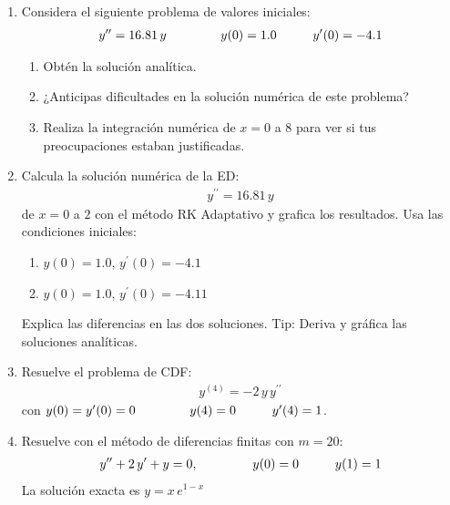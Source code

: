 \documentclass[hidelinks,12pt]{article}
\newcommand{\pderivada}[1]{\ensuremath{{#1}^{\prime}}}
\newcommand{\sderivada}[1]{\ensuremath{{#1}^{\prime \prime}}}
\newcommand{\nderivada}[2]{\ensuremath{{#1}^{(#2)}}}
\begin{document}
\begin{enumerate}
\item Considera el siguiente problema de valores iniciales:
\begin{align*}
\sderivada{y} = 16.81 \, y \hspace{1.5cm} y (0) = 1.0 \hspace{1cm} \pderivada{y} (0) = -4.1
\end{align*}
\begin{enumerate}
\item Obtén la solución analítica.
\item ¿Anticipas dificultades en la solución numérica de este problema?
\item Realiza la integración numérica de $x = 0$ a $8$ para ver si tus preocupaciones estaban justificadas.
\end{enumerate}

\item Calcula la solución numérica de la ED:
\begin{align*}
\sderivada{y} = 16.81 \, y
\end{align*}
de $x = 0$ a $2$ con el método RK Adaptativo y grafica los resultados. Usa las condiciones iniciales:
\begin{enumerate}
\item $y (0) = 1.0$, $\pderivada{y} (0) = -4.1$
\item $y (0) = 1.0$, $\pderivada{y} (0) = -4.11$
\end{enumerate} 
Explica las diferencias en las dos soluciones. Tip: Deriva y gráfica las soluciones analíticas.

\item Resuelve el problema de CDF:
\begin{align*}
\nderivada{y}{4} = -2 \, y \, \sderivada{y}
\end{align*}
con $y (0) = \pderivada{y} (0) = 0 \hspace{1.5cm} y (4) = 0 \hspace{1cm} \pderivada{y} (4) = 1$.

\item Resuelve con el método de diferencias finitas con $m = 20$:
\begin{align*}
\sderivada{y} + 2 \, \pderivada{y} + y = 0, \hspace{1.5cm} y (0) = 0 \hspace{1cm} y (1) = 1
\end{align*}
La solución exacta es $y = x \, e^{1-x}$

\end{enumerate}
\end{document}
